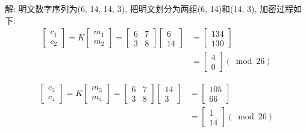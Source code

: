 \documentclass[UTF8]{ctexart}
\begin{document}
\begin{itemize}
\begin{enumerate}
            解: 明文数字序列为(6, 14, 14, 3), 把明文划分为两组(6, 14)和(14, 3), 加密过程如下:
            $$
            \begin{aligned}
                \left[ \begin{array}{c}{c_1}\\ {c_2}\end{array}\right]=K\left[ \begin{array}{c}{m_1}\\ {m_2} \end{array}\right]
                        =\left[ \begin{array}{cc}{6} &{7}\\ {3} &{8} \end{array}\right]\left[\begin{array}{c}{6}\\ {14} \end{array}\right]
                            &=\left[ \begin{array}{c}{134}\\ {130} \end{array}\right]\\
                                &=\left[ \begin{array}{c}{4}\\ {0} \end{array}\right](\bmod 26)
            \end{aligned}
            $$

            $$
            \begin{aligned}
                \left[ \begin{array}{c}{c_3}\\ {c_4}\end{array}\right]=K\left[ \begin{array}{c}{m_3}\\ {m_4} \end{array}\right]
                        =\left[ \begin{array}{cc}{6} &{7}\\ {3} &{8} \end{array}\right]\left[\begin{array}{c}{14}\\ {3} \end{array}\right]
                            &=\left[ \begin{array}{c}{105}\\ {66} \end{array}\right]\\
                                &=\left[ \begin{array}{c}{1}\\ {14} \end{array}\right](\bmod 26)
            \end{aligned}
            $$


\end{enumerate}
\end{itemize}
\end{document}
